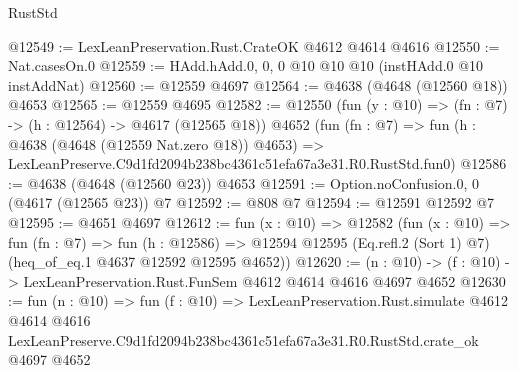 \begin{lexlean}{RustStd}
\begin{coremodule}
@12549 := LexLeanPreservation.Rust.CrateOK @4612 @4614 @4616
@12550 := Nat.casesOn.{0}
@12559 := HAdd.hAdd.{0, 0, 0} @10 @10 @10 (instHAdd.{0} @10 instAddNat)
@12560 := @12559 @4697
@12564 := @4638 (@4648 (@12560 @18)) @4653
@12565 := @12559 @4695
@12582 := @12550
    (fun (y : @10) => (fn : @7) -> (h : @12564) -> @4617 (@12565 @18))
    @4652
    (fun (fn : @7) =>
    fun (h : @4638 (@4648 (@12559 Nat.zero @18)) @4653) =>
    LexLeanPreserve.C9d1fd2094b238bc4361c51efa67a3e31.R0.RustStd.fun0)
@12586 := @4638 (@4648 (@12560 @23)) @4653
@12591 := Option.noConfusion.{0, 0} (@4617 (@12565 @23)) @7
@12592 := @808 @7
@12594 := @12591 @12592 @7
@12595 := @4651 @4697
@12612 := fun (x : @10) =>
  @12582
    (fun (x : @10) =>
    fun (fn : @7) =>
    fun (h : @12586) =>
    @12594 @12595 (Eq.refl.{2} (Sort 1) @7) (heq_of_eq.{1} @4637 @12592 @12595 @4652))
@12620 := (n : @10) -> (f : @10) -> LexLeanPreservation.Rust.FunSem @4612 @4614 @4616 @4697 @4652
@12630 := fun (n : @10) =>
  fun (f : @10) =>
  LexLeanPreservation.Rust.simulate
    @4612
    @4614
    @4616
    LexLeanPreserve.C9d1fd2094b238bc4361c51efa67a3e31.R0.RustStd.crate_ok
    @4697
    @4652
\end{coremodule}
\end{lexlean}
